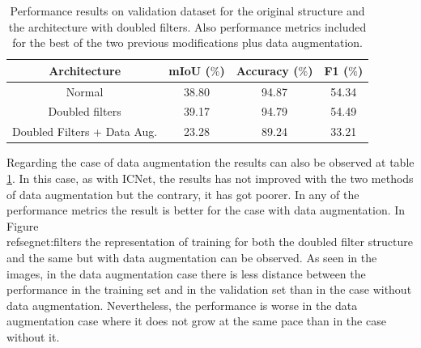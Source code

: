 \documentclass[12pt,a4paper]{article}
\begin{document}
\begin{table}[h!]
  \begin{center}
    
    \begin{tabular}{|c|c|c|c|} %
      \textbf{Architecture} & \textbf{mIoU ($\%$)} & \textbf{Accuracy ($\%$)} & \textbf{F1 ($\%$)} \\
      \hline
      Normal & 38.80 & 94.87 & 54.34\\
      \hline
      Doubled filters & 39.17 & 94.79  & 54.49 \\  
      \hline
      Doubled Filters + Data Aug. & 23.28 & 89.24 & 33.21\\
    \end{tabular}
    \caption{Performance results on validation dataset for the original structure and the architecture with doubled filters. Also performance metrics included for the best of the two previous modifications plus data augmentation.}
    \label{segnet:table1}
  \end{center}
\end{table}

Regarding the case of data augmentation the results can also be observed at table \ref{segnet:table1}. In this case, as with ICNet, the results has not improved with the two methods of data augmentation but the contrary, it has got poorer. In any of the performance metrics the result is better for the case with data augmentation. In Figure \\ref{segnet:filters} the representation of training for both the doubled filter structure and the same but with data augmentation can be observed. As seen in the images, in the data augmentation case there is less distance between the performance in the training set and in the validation set than in the case without data augmentation. Nevertheless, the performance is worse in the data augmentation case where it does not grow at the same pace than in the case without it.\newline
\end{document}
